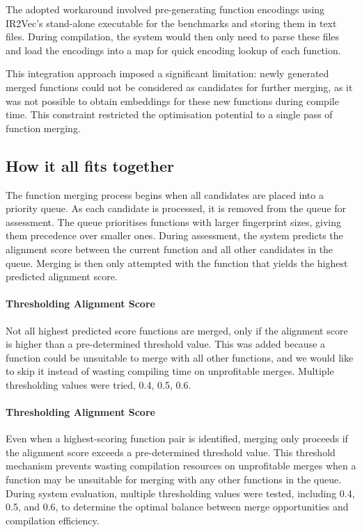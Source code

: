 The adopted workaround involved pre-generating function encodings using IR2Vec's stand-alone executable for the benchmarks and storing them in text files. During compilation, the system would then only need to parse these files and load the encodings into a map for quick encoding lookup of each function.

This integration approach imposed a significant limitation: newly generated merged functions could not be considered as candidates for further merging, as it was not possible to obtain embeddings for these new functions during compile time. This constraint restricted the optimisation potential to a single pass of function merging.

\subsection{How it all fits together}
The function merging process begins when all candidates are placed into a priority queue. As each candidate is processed, it is removed from the queue for assessment. The queue prioritises functions with larger fingerprint sizes, giving them precedence over smaller ones. During assessment, the system predicts the alignment score between the current function and all other candidates in the queue. Merging is then only attempted with the function that yields the highest predicted alignment score.

\paragraph{Thresholding Alignment Score} Not all highest predicted score functions are merged, only if the alignment score is higher than a pre-determined threshold value. This was added because a function could be unsuitable to merge with all other functions, and we would like to skip it instead of wasting compiling time on unprofitable merges. Multiple thresholding values were tried, 0.4, 0.5, 0.6.

\paragraph{Thresholding Alignment Score} Even when a highest-scoring function pair is identified, merging only proceeds if the alignment score exceeds a pre-determined threshold value. This threshold mechanism prevents wasting compilation resources on unprofitable merges when a function may be unsuitable for merging with any other functions in the queue. During system evaluation, multiple thresholding values were tested, including 0.4, 0.5, and 0.6, to determine the optimal balance between merge opportunities and compilation efficiency.

